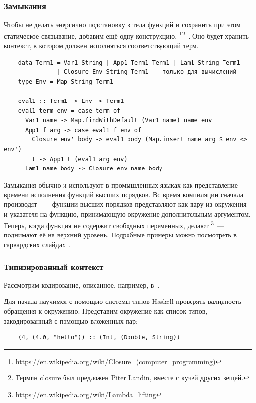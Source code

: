 \subsubsection{Замыкания} \label{subsubsec:closures}

Чтобы не делать энергично подстановку в тела функций и сохранить при этом статическое связывание, добавим ещё одну конструкцию, \footnote{\url{https://en.wikipedia.org/wiki/Closure_(computer_programming)}}\footnote{Термин closure был предложен Piter Landin, вместе с кучей других вещей.}~\cite[глава 11]{nystrom2021crafting}.
Оно будет хранить контекст, в котором должен исполняться соответствующий терм.

\begin{verbatim}
    data Term1 = Var1 String | App1 Term1 Term1 | Lam1 String Term1
               | Closure Env String Term1 -- только для вычислений
    type Env = Map String Term1

    eval1 :: Term1 -> Env -> Term1
    eval1 term env = case term of
      Var1 name -> Map.findWithDefault (Var1 name) name env
      App1 f arg -> case eval1 f env of
        Closure env' body -> eval1 body (Map.insert name arg $ env <> env')
        t -> App1 t (eval1 arg env)
      Lam1 name body -> Closure env name body
\end{verbatim}

Замыкания обычно и используют в промышленных языках как представление времени исполнения функций высших порядков.
Во время компиляции сначала производят ~--- функции высших порядков представляют как пару из окружения и указателя на функцию, принимающую окружение дополнительным аргументом.
Теперь, когда функция не содержит свободных переменных, делают \footnote{\url{https://en.wikipedia.org/wiki/Lambda_lifting}}~--- поднимают её на верхний уровень.
Подробные примеры можно посмотреть в гарвардских слайдах~\cite{closures-slides}.

\subsubsection{Типизированный контекст} \label{subsubsec:typed-env}

Рассмотрим кодирование, описанное, например, в~\cite{kiselyov2012typed}.

Для начала научимся с помощью системы типов Haskell проверять валидность обращения к окружению.
Представим окружение как список типов, закодированный с помощью вложенных пар:
\begin{verbatim}
    (4, (4.0, "hello")) :: (Int, (Double, String))
\end{verbatim}

